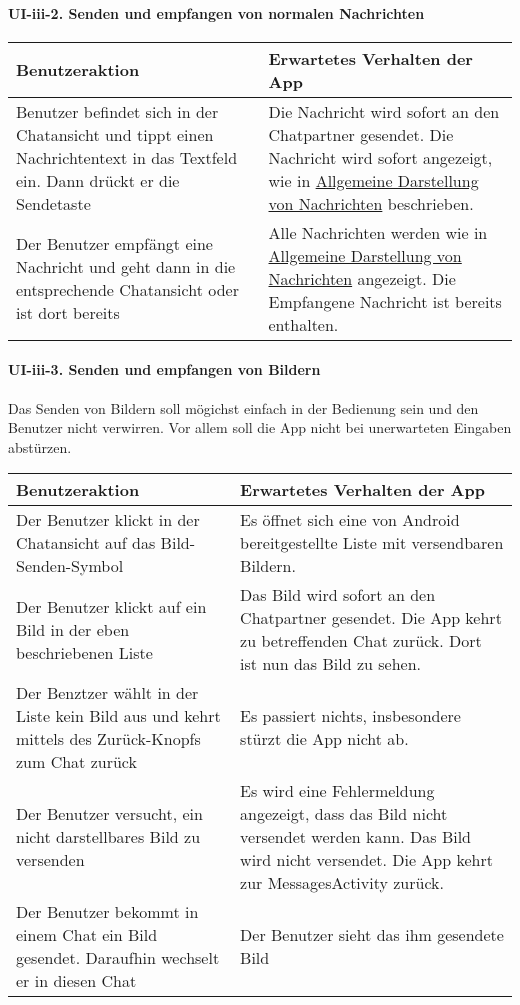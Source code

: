 \paragraph{UI-iii-2. Senden und empfangen von normalen
Nachrichten}\label{senden-und-empfangen-von-normalen-nachrichten}

\begin{longtable}{|p{8cm}|p{8.5cm}|}
\hline
Benutzeraktion & Erwartetes Verhalten der App\tabularnewline
\hline

Benutzer befindet sich in der Chatansicht und tippt einen
Nachrichtentext in das Textfeld ein. Dann drückt er die Sendetaste & Die
Nachricht wird sofort an den Chatpartner gesendet. Die Nachricht wird
sofort angezeigt, wie in
\href{Manueller-Test-UI\#allgemeine-darstellung-der-nachrichten}{Allgemeine
Darstellung von Nachrichten} beschrieben.\tabularnewline
Der Benutzer empfängt eine Nachricht und geht dann in die entsprechende
Chatansicht oder ist dort bereits & Alle Nachrichten werden wie in
\href{Manueller-Test-UI\#allgemeine-darstellung-der-nachrichten}{Allgemeine
Darstellung von Nachrichten} angezeigt. Die Empfangene Nachricht ist
bereits enthalten.\tabularnewline
\hline
\end{longtable}

\paragraph{UI-iii-3. Senden und empfangen von
Bildern}\label{senden-und-empfangen-von-bildern}

Das Senden von Bildern soll mögichst einfach in der Bedienung sein und
den Benutzer nicht verwirren. Vor allem soll die App nicht bei
unerwarteten Eingaben abstürzen.

\begin{longtable}{|p{8cm}|p{8.5cm}|}
\hline
Benutzeraktion & Erwartetes Verhalten der App\tabularnewline
\hline

Der Benutzer klickt in der Chatansicht auf das Bild-Senden-Symbol & Es
öffnet sich eine von Android bereitgestellte Liste mit versendbaren
Bildern.\tabularnewline
Der Benutzer klickt auf ein Bild in der eben beschriebenen Liste & Das
Bild wird sofort an den Chatpartner gesendet. Die App kehrt zu
betreffenden Chat zurück. Dort ist nun das Bild zu sehen.\tabularnewline
Der Benztzer wählt in der Liste kein Bild aus und kehrt mittels des
Zurück-Knopfs zum Chat zurück & Es passiert nichts, insbesondere stürzt
die App nicht ab.\tabularnewline
Der Benutzer versucht, ein nicht darstellbares Bild zu versenden & Es
wird eine Fehlermeldung angezeigt, dass das Bild nicht versendet werden
kann. Das Bild wird nicht versendet. Die App kehrt zur MessagesActivity
zurück.\tabularnewline
Der Benutzer bekommt in einem Chat ein Bild gesendet. Daraufhin wechselt
er in diesen Chat & Der Benutzer sieht das ihm gesendete
Bild\tabularnewline
\hline
\end{longtable}

